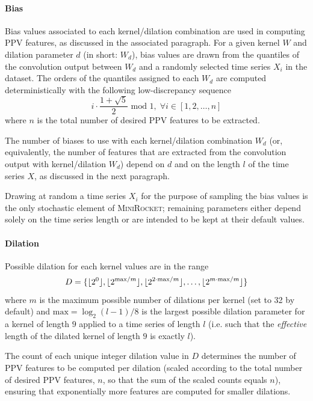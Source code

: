 \paragraph{Bias}
Bias values associated to each kernel/dilation combination are used in computing PPV features, as discussed in the associated paragraph.
For a given kernel $W$ and dilation parameter $d$ (in short: $W_d$), bias values are drawn from the quantiles of the convolution output between $W_d$ and a randomly selected time series $X_i$ in the dataset. The orders of the quantiles assigned to each $W_d$ are computed deterministically with the following low-discrepancy sequence
\begin{equation}
i\cdot\frac{1+\sqrt{5}}{2}\text{ mod }1,\;\forall i\in [1,2,\dots,n]
\end{equation}
where $n$ is the total number of desired PPV features to be extracted.

The number of biases to use with each kernel/dilation combination $W_d$ (or, equivalently, the number of features that are extracted from the convolution output with kernel/dilation $W_d$) depend on $d$ and on the length $l$ of the time series $X$, as discussed in the next paragraph.

Drawing at random a time series $X_i$ for the purpose of sampling the bias values is the only stochastic element of \textsc{MiniRocket}; remaining parameters either depend solely on the time series length or are intended to be kept at their default values.


\paragraph{Dilation}
Possible dilation for each kernel values are in the range
\begin{equation}
D=\{\lfloor2^0\rfloor,\lfloor2^{\text{max}/m}\rfloor,\lfloor2^{2\cdot\text{max}/m}\rfloor,\dots,\lfloor2^{m\cdot\text{max}/m}\rfloor\}
\end{equation}
where $m$ is the maximum possible number of dilations per kernel (set to 32 by default) and $\text{max}=\log_2(l-1)/8$ is the largest possible dilation parameter for a kernel of length $9$ applied to a time series of length $l$ (i.e. such that the \textit{effective} length of the dilated kernel of length $9$ is exactly $l$).

The count of each unique integer dilation value in $D$ determines the number of PPV features to be computed per dilation (scaled according to the total number of desired PPV features, $n$, so that the sum of the scaled counts equals $n$), ensuring that exponentially more features are computed for smaller dilations.


